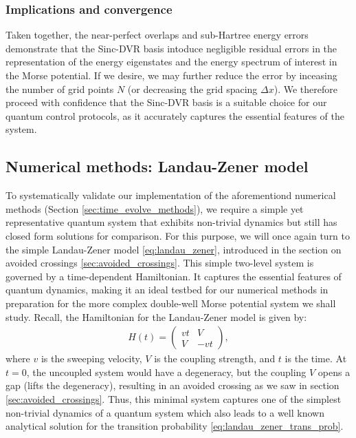 \documentclass{subfiles}
\begin{document}
\subsubsection{Implications and convergence}
Taken together, the near-perfect overlaps and sub-Hartree energy errors demonstrate that the Sinc-DVR basis intoduce negligible residual errors in the representation of the energy eigenstates and the energy spectrum of interest in the Morse potential. If we desire, we may further reduce the error by inceasing the number of grid points $N$ (or decreasing the grid spacing $\Delta x$). We therefore proceed with confidence that the Sinc-DVR basis is a suitable choice for our quantum control protocols, as it accurately captures the essential features of the system.

\subsection{Numerical methods: Landau-Zener model}
To systematically validate our implementation of the aforementiond numerical methods (Section \ref{sec:time_evolve_methods}), we require a simple yet representative quantum system that exhibits non-trivial dynamics but still has closed form solutions for comparison. For this purpose, we will once again turn to the simple Landau-Zener model \eqref{eq:landau_zener}, introduced in the section on avoided crossings \ref{sec:avoided_crossings}. This simple two-level system is governed by a time-dependent Hamiltonian. It captures the essential features of quantum dynamics, making it an ideal testbed for our numerical methods in preparation for the more complex double-well Morse potential system we shall study.
Recall, the Hamiltonian for the Landau-Zener model is given by:
\begin{align*}
    H(t) = \begin{pmatrix}
        vt & V \\
        V & -vt
\end{pmatrix},
\end{align*}
where $v$ is the sweeping velocity, $V$ is the coupling strength, and $t$ is the time. At $t=0$, the uncoupled system would have a degeneracy, but the coupling $V$ opens a gap (lifts the degeneracy), resulting in an avoided crossing as we saw in section \ref{sec:avoided_crossings}. Thus, this minimal system captures one of the simplest non-trivial dynamics of a quantum system which also leads to a well known analytical solution for the transition probability \eqref{eq:landau_zener_trans_prob}. 
\end{document}
